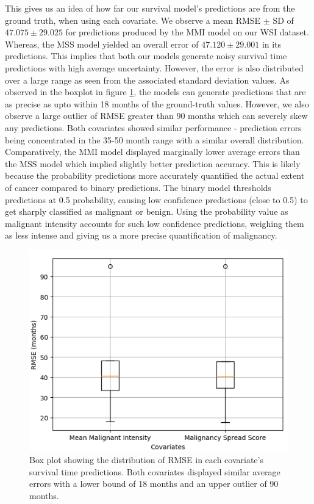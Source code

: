 \documentclass{l4proj}
\begin{document}
This gives us an idea of how far our survival model's predictions are from the ground truth, when using each covariate. We observe a mean RMSE \(\pm\) SD of \(47.075 \pm 29.025\) for predictions produced by the MMI model on our WSI dataset.  Whereas, the MSS model yielded an overall error of \(47.120 \pm 29.001\) in its predictions. This implies that both our models generate noisy survival time predictions with high average uncertainty. However, the error is also distributed over a large range as seen from the associated standard deviation values. As observed in the boxplot in figure \ref{fig:RMSE_box}, the models can generate predictions that are as precise as upto within 18 months of the ground-truth values. However, we also observe a large outlier of RMSE greater than 90 months which can severely skew any predictions. Both covariates showed similar performance - prediction errors being concentrated in the 35-50 month range with a similar overall distribution. Comparatively, the MMI model displayed marginally lower average errors than the MSS model which implied slightly better prediction accuracy. This is likely because the probability predictions more accurately quantified the actual extent of cancer compared to binary predictions. The binary model thresholds predictions at 0.5 probability, causing low confidence predictions (close to 0.5) to get sharply classified as malignant or benign. Using the probability value as malignant intensity accounts for such low confidence predictions, weighing them as less intense and giving us a more precise quantification of malignancy.

\begin{figure}[h]
    \centering
    \includegraphics[scale=0.3]{images/RMSE-boxplot.png}
    \caption{Box plot showing the distribution of RMSE in each covariate's survival time predictions. Both covariates displayed similar average errors with a lower bound of 18 months and an upper outlier of 90 months.}
    \label{fig:RMSE_box}
\end{figure}
\end{document}
